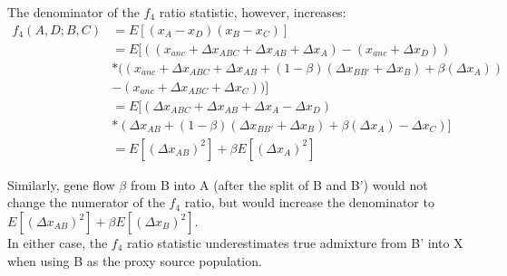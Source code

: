 \documentclass[12pt]{report}
\begin{document}
\begin{enumerate}
The denominator of the $f_4$ ratio statistic, however, increases:
\begin{align*}
f_4(A,D;B,C) &= E[(x_A - x_D)(x_B - x_C)] \\
&= E[((x_{anc} + \Delta{x_{ABC}} + \Delta{x_{AB}} + \Delta{x_{A}}) - (x_{anc} + \Delta{x_{D}}))\\
&*((x_{anc} + \Delta{x_{ABC}} + \Delta{x_{AB}} + (1 - \beta)(\Delta{x_{BB'}} + \Delta{x_{B}}) + \beta(\Delta{x_{A}})) \\
&- (x_{anc} + \Delta{x_{ABC}} + \Delta{x_C}))] \\
&= E[(\Delta{x_{ABC}} + \Delta{x_{AB}} + \Delta{x_{A}} - \Delta{x_{D}})\\
&*(\Delta{x_{AB}} + (1 - \beta)(\Delta{x_{BB'}} + \Delta{x_{B}}) + \beta(\Delta{x_{A}}) - \Delta{x_C})]\\
&=E[(\Delta{x_{AB}})^2] + \beta E[(\Delta{x_{A}})^2]
\end{align*}
\end{enumerate}
Similarly, gene flow $\beta$ from B into A (after the split of B and B') would not change the numerator of the $f_4$ ratio, but would increase the denominator to $E[(\Delta{x_{AB}})^2] + \beta E[(\Delta{x_{B}})^2]$.\\
In either case, the $f_4$ ratio statistic underestimates true admixture from B' into X when using B as the proxy source population. 
\end{document}
